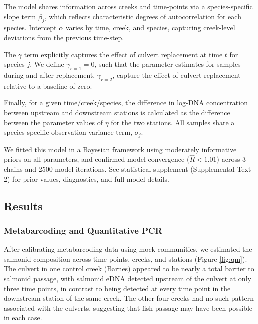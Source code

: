 \documentclass[
]{article}
\begin{document}
The model shares information across creeks and time-points via a
species-specific slope term \(\beta_{j}\), which reflects characteristic
degrees of autocorrelation for each species. Intercept \(\alpha\) varies
by time, creek, and species, capturing creek-level deviations from the
previous time-step.

The \(\gamma\) term explicitly captures the effect of culvert
replacement at time \(t\) for species \(j\). We define
\(\gamma_{r = 1} = 0\), such that the parameter estimates for samples
during and after replacement, \(\gamma_{r = 2}\), capture the effect of
culvert replacement relative to a baseline of zero.

Finally, for a given time/creek/species, the difference in log-DNA
concentration between upstream and downstream stations is calculated as
the difference between the parameter values of \(\eta\) for the two
stations. All samples share a species-specific observation-variance
term, \(\sigma_{j}\).

We fitted this model in a Bayesian framework using moderately
informative priors on all parameters, and confirmed model convergence
(\(\hat{R} < 1.01\)) across 3 chains and 2500 model iterations. See
statistical supplement (Supplemental Text 2) for prior values,
diagnostics, and full model details.

\hypertarget{results}{%
\subsection{Results}\label{results}}

\hypertarget{metabarcoding-and-quantitative-pcr}{%
\subsubsection{Metabarcoding and Quantitative
PCR}\label{metabarcoding-and-quantitative-pcr}}

After calibrating metabarcoding data using mock communities, we
estimated the salmonid composition across time points, creeks, and
stations (Figure \ref{fig:qm}). The culvert in one control creek
(Barnes) appeared to be nearly a total barrier to salmonid passage, with
salmonid eDNA detected upstream of the culvert at only three time
points, in contrast to being detected at every time point in the
downstream station of the same creek. The other four creeks had no such
pattern associated with the culverts, suggesting that fish passage may
have been possible in each case.
\end{document}
